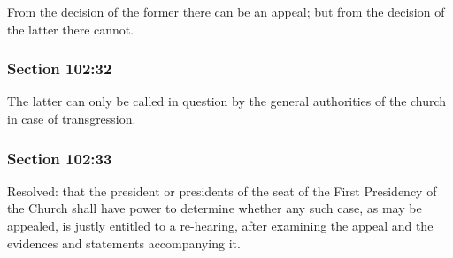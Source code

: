 		From the decision of the former there can be an appeal; but from the decision of the latter there cannot.


	\subsubsection{Section 102:32} %
		\label{DC102-32}

		The latter can only be called in question by the general authorities of the church in case of transgression.


	\subsubsection{Section 102:33} %
		\label{DC102-33}

		Resolved: that the president or presidents of the seat of the First Presidency of the Church shall have power to determine whether any such case, as may be appealed, is justly entitled to a re-hearing, after examining the appeal and the evidences and statements accompanying it.


